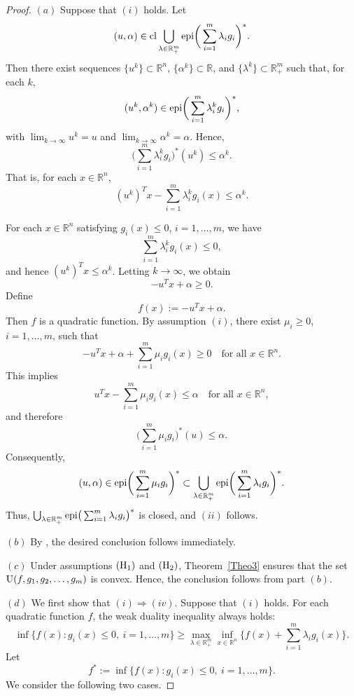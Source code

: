 \documentclass[]{interact}
\theoremstyle{plain}%
\theoremstyle{definition}
\theoremstyle{remark}
\begin{document}
	\begin{proof}
		$(a)$ Suppose that $(i)$ holds. Let
		\[
		(u,\alpha)\in {\rm cl}\bigcup_{\lambda\in \mathbb{R}^m_+} 
		{\rm epi}\bigg(\sum_{i=1}^{m}\lambda_ig_i \bigg)^*.
		\]
		Then there exist sequences $\{u^k\}\subset\mathbb{R}^n$, 
		$\{\alpha^k\}\subset\mathbb{R}$, and $\{\lambda^k\}\subset \mathbb{R}^m_+$ such that, for each $k$,
		\[
		(u^k,\alpha^k)\in {\rm epi}\bigg(\sum_{i=1}^{m}\lambda_i^kg_i \bigg)^*,
		\]
		with $\lim_{k\to \infty}u^k=u$ and $\lim_{k\to \infty}\alpha^k=\alpha$.
		Hence,
		\[
		\bigg(\sum_{i=1}^{m}\lambda_i^kg_i \bigg)^*(u^k)\leq \alpha^k.
		\]
		That is, for each $x\in \mathbb{R}^n$,
		\[
		(u^k)^Tx-\sum_{i=1}^{m}\lambda_i^kg_i(x) \leq \alpha^k.
		\]
		
		For each $x\in \mathbb{R}^n$ satisfying $g_i(x)\leq 0$, $i=1,\ldots,m$, we have
		\[
		\sum_{i=1}^{m}\lambda_i^kg_i(x)\leq 0,
		\]
		and hence $(u^k)^Tx\leq \alpha^k$.
		Letting $k\to \infty$, we obtain
		\[
		-u^Tx+\alpha\geq 0.
		\]
		Define
		\[
		f(x):=-u^Tx+\alpha.
		\]
		Then $f$ is a quadratic function. By assumption $(i)$, there exist $\mu_i\geq 0$, $i=1,\ldots,m$, such that
		\[
		-u^Tx+\alpha+\sum_{i=1}^{m}\mu_ig_i(x)\geq 0
		\quad \text{for all } x\in \mathbb{R}^n.
		\]
		This implies
		\[
		u^Tx-\sum_{i=1}^{m}\mu_ig_i(x)\leq \alpha
		\quad \text{for all } x\in \mathbb{R}^n,
		\]
		and therefore
		\[
		\bigg(\sum_{i=1}^{m}\mu_ig_i\bigg)^*(u)\leq\alpha.
		\]
		Consequently,
		\[
		(u,\alpha)\in {\rm epi}\bigg(\sum_{i=1}^{m}\mu_ig_i\bigg)^*
		\subset \bigcup_{\lambda\in \mathbb{R}^m_+} 
		{\rm epi}\bigg(\sum_{i=1}^{m}\lambda_ig_i \bigg)^*.
		\]
		Thus, $\bigcup_{\lambda\in \mathbb{R}^m_+} 
		{\rm epi}\big(\sum_{i=1}^{m}\lambda_ig_i \big)^*$ is closed, and $(ii)$ follows.
		
		\medskip
		$(b)$ By \cite[Theorem~1]{LaraUrruty2022}, the desired conclusion follows immediately.
		
		\medskip
		$(c)$ Under assumptions $({\rm H_1})$ and $({\rm H_2})$, Theorem~\ref{Theo3} ensures that the set
		${\rm U}(f, g_1, g_2,\ldots,g_m)$ is convex. Hence, the conclusion follows from part $(b)$.
		
		$(d)$ We first show that $(i)\Rightarrow(iv)$. 
		Suppose that $(i)$ holds. For each quadratic function $f$, the weak duality inequality always holds:
		\[
		\inf \{f(x): g_i(x)\leq 0,\ i=1,\ldots,m\}
		\geq
		\max_{\lambda\in  \mathbb{R}^m_+}
		\inf_{x\in \mathbb{R}^n}
		\bigg\{f(x)+\sum_{i=1}^{m}\lambda_ig_i(x)\bigg\}.
		\]
		Let
		\[
		f^*:=\inf \{f(x): g_i(x)\leq 0,\ i=1,\ldots,m\}.
		\]
		We consider the following two cases.
		

\end{proof}
\end{document}
